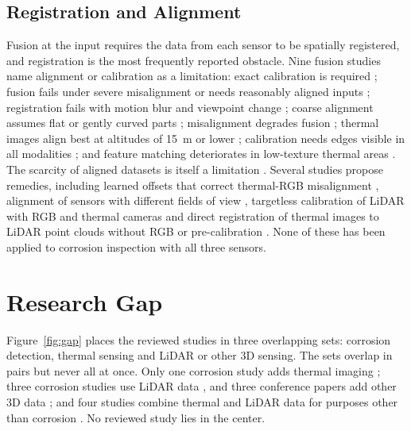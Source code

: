 \subsection{Registration and Alignment}

Fusion at the input requires the data from each sensor to be spatially
registered, and registration is the most frequently reported obstacle. Nine
fusion studies name alignment or calibration as a limitation: exact calibration
is required \citep{Cheng2025}; fusion fails under severe misalignment \citep{Zhu2026} or needs
reasonably aligned inputs \citep{Xu2026}; registration fails with motion blur and
viewpoint change \citep{Bin2023}; coarse alignment assumes flat or gently curved parts
\citep{Li2024c}; misalignment degrades fusion \citep{Cao2026}; thermal images align best at
altitudes of 15~m or lower \citep{Nooralishahi2022}; calibration needs edges visible in all
modalities \citep{Yang2024}; and feature matching deteriorates in low-texture thermal areas
\citep{Zhu2026a}. The scarcity of aligned datasets is itself a limitation \citep{Hou2024}. Several studies propose remedies, including learned
offsets that correct thermal-RGB misalignment \citep{Liu2025}, alignment of sensors with
different fields of view \citep{Shahsavarani2024}, targetless calibration of LiDAR with RGB and
thermal cameras \citep{Tran2024,Yang2024} and direct registration of thermal images to LiDAR
point clouds without RGB or pre-calibration \citep{Zhu2026a}. None of these has been
applied to corrosion inspection with all three sensors.

\section{Research Gap}
\label{sec:lr-gap}

Figure~\ref{fig:gap} places the reviewed studies in three overlapping sets:
corrosion detection, thermal sensing and LiDAR or other 3D sensing. The sets
overlap in pairs but never all at once. Only one corrosion study adds thermal
imaging \citep{Lim2021}; three corrosion studies use LiDAR data \citep{Maru2025,PimenteldeFigueiredo2025,PallasEnguita2025}, and
three conference papers add other 3D data \citep{Ding2025,Zheng2025,Haitz2022}; and four studies combine thermal and LiDAR data
for purposes other than corrosion \citep{Tran2025,Tran2024,Yang2024,Zhu2026a}. No reviewed study lies in
the center.

